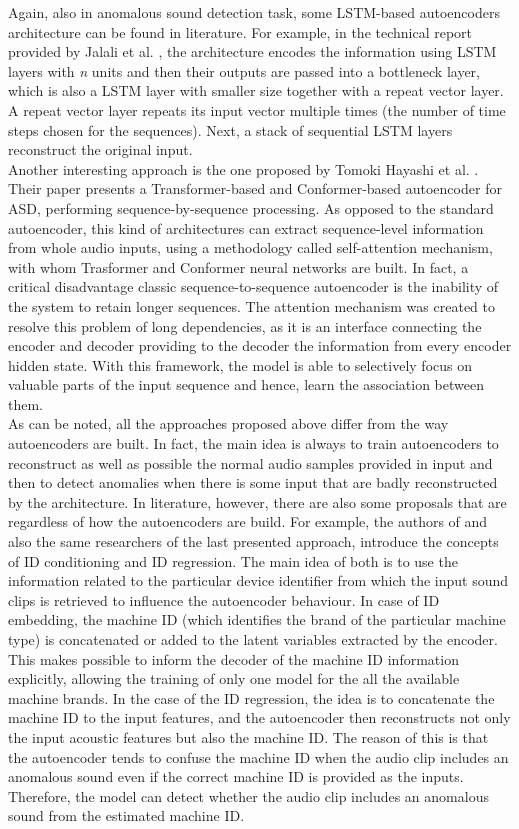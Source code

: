 Again, also in anomalous sound detection task, some LSTM-based autoencoders architecture can be found in literature. For example, in the technical report provided by Jalali et al. \cite{16LSTMDeepAutoencodersForASDtask}, the architecture encodes the information using LSTM layers with \textit{n} units and then their outputs are passed into a bottleneck layer, which is also a LSTM layer with smaller size together with a repeat vector layer. A repeat vector layer repeats its input vector multiple times (the number of time steps chosen for the sequences). Next, a stack of sequential LSTM layers reconstruct the original input.\\
Another interesting approach is the one proposed by Tomoki Hayashi et al. \cite{17ConformerBasedIDAWAREAutoencoder}. Their paper presents a Transformer-based and Conformer-based autoencoder for ASD, performing sequence-by-sequence processing. As opposed to the standard autoencoder, this kind of architectures can extract sequence-level information from whole audio inputs, using a methodology called self-attention mechanism, with whom Trasformer and Conformer neural networks are built. In fact, a critical disadvantage classic sequence-to-sequence autoencoder is the inability of the system to retain longer sequences. The attention mechanism was created to resolve this problem of long dependencies, as it is an interface connecting the encoder and decoder providing to the decoder the information from every encoder hidden state. With this framework, the model is able to selectively focus on valuable parts of the input sequence and hence, learn the association between them.\\
As can be noted, all the approaches proposed above differ from the way autoencoders are built. In fact, the main idea is always to train autoencoders to reconstruct as well as possible the normal audio samples provided in input and then to detect anomalies when there is some input that are badly reconstructed by the architecture. In literature, however, there are also some proposals that are regardless of how the autoencoders are build. For example, the authors of \cite{18IDConditionedAutoEncoder}\cite{19DescriptionDiscussionDCASE2020} and also the same researchers of the last presented approach, introduce the concepts of ID conditioning and ID regression. The main idea of both is to use the information related to the particular device identifier from which the input sound clips is retrieved to influence the autoencoder behaviour. In case of ID embedding, the machine ID (which identifies the brand of the particular machine type) is concatenated or added to the latent variables extracted by the encoder. This makes possible to inform the decoder of the machine ID information explicitly, allowing the training of only one model for the all the available machine brands. In the case of the ID regression, the idea is to concatenate the machine ID to the input features, and the autoencoder then reconstructs not only the input acoustic features but also the machine ID. The reason of this is that the autoencoder tends to confuse the machine ID when the audio clip includes an anomalous sound even if the correct machine ID is provided as the inputs. Therefore, the model can detect whether the audio clip includes an anomalous sound from the estimated machine ID.